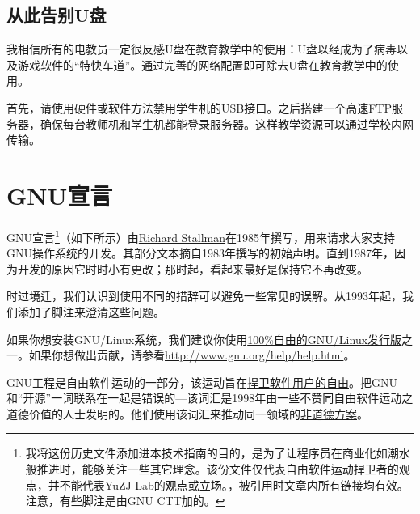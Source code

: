 \subsection{从此告别U盘}
我相信所有的电教员一定很反感U盘在教育教学中的使用：U盘以经成为了病毒以及游戏软件的“特快车道”。通过完善的网络配置即可除去U盘在教育教学中的使用。\par
首先，请使用硬件或软件方法禁用学生机的USB接口。之后搭建一个高速FTP服务器，确保每台教师机和学生机都能登录服务器。这样教学资源可以通过学校内网传输。
\section{GNU宣言}
GNU宣言\footnote{我将这份历史文件添加进本技术指南的目的，是为了让程序员在商业化如潮水般推进时，能够关注一些其它理念。该份文件仅代表自由软件运动捍卫者的观点，并不能代表YuZJ Lab的观点或立场。\cite{gnum}，被引用时文章内所有链接均有效。注意，有些脚注是由GNU CTT加的。}（如下所示）由\href{http://www.stallman.org/}{Richard Stallman}在1985年撰写，用来请求大家支持GNU操作系统的开发。其部分文本摘自1983年撰写的初始声明。直到1987年，因为开发的原因它时时小有更改；那时起，看起来最好是保持它不再改变。\par
时过境迁，我们认识到使用不同的措辞可以避免一些常见的误解。从1993年起，我们添加了脚注来澄清这些问题。\par
如果你想安装GNU/Linux系统，我们建议你使用\href{http://www.gnu.org/distros}{100\%自由的GNU/Linux发行版}之一。如果你想做出贡献，请参看\url{http://www.gnu.org/help/help.html}。\par
GNU工程是自由软件运动的一部分，该运动旨在\href{http://www.gnu.org/philosophy/free-sw.html}{捍卫软件用户的自由}。把GNU和“开源”一词联系在一起是错误的—该词汇是1998年由一些不赞同自由软件运动之道德价值的人士发明的。他们使用该词汇来推动同一领域的\href{http://www.gnu.org/philosophy/open-source-misses-the-point.html}{非道德方案}。\par
